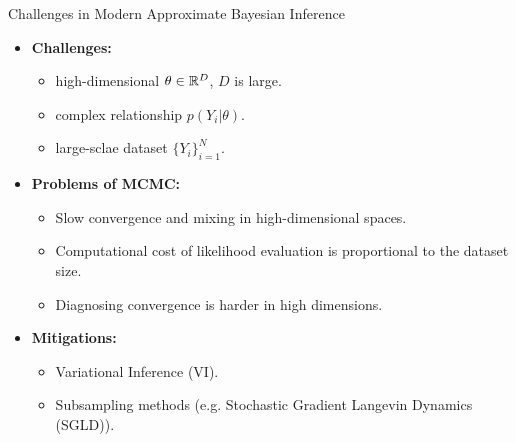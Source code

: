 \documentclass[10pt,xcolor=table]{beamer}
\begin{document}
\begin{frame}{Challenges in Modern Approximate Bayesian Inference}
	\begin{itemize}
		\item \textbf{Challenges:}
		\begin{itemize}
			\item high-dimensional $\theta \in \mathbb{R}^{D}$, $D$ is large.
			\item complex relationship $p(Y_{i}|\theta)$.
			\item large-sclae dataset $\{Y_{i}\}_{i=1}^{N}$. 
		\end{itemize}\pause
		\item \textbf{Problems of MCMC:}
		\begin{itemize}
			\item Slow convergence and mixing in high-dimensional spaces.
			\item Computational cost of likelihood evaluation is proportional to the dataset size.
			\item Diagnosing convergence is harder in high dimensions.
		\end{itemize} \pause
		\item \textbf{Mitigations:}
		\begin{itemize}
			\item Variational Inference (VI).
			\item Subsampling methods (e.g. Stochastic Gradient Langevin Dynamics (SGLD)).
		\end{itemize}
	\end{itemize}
\end{frame}

\end{document}
